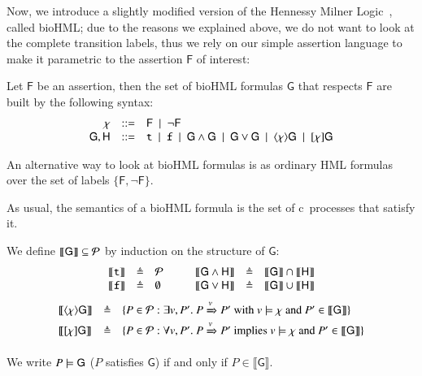 Now, we introduce a slightly modified version of the Hennessy Milner Logic~\cite{HM80}, called bioHML; due to the reasons we explained above, we do not want to look at the complete transition labels, thus we rely on our simple assertion language to make it parametric to the assertion $\mathsf{F}$ of interest:

\begin{definition}[BioHML]
Let   $\mathsf{F}$ be an assertion, then 
the set of bioHML formulas $\mathsf{G}$ that respects $\mathsf{F}$ are built by the following syntax:
$$
\begin{array}{rcl}
\chi & ::= & \mathsf{F}~\mid~ \neg \mathsf{F}\\
\mathsf{G},\mathsf{H} &::= &{\tt t} ~\mid~ {\tt f} ~\mid~ \mathsf{G}\wedge \mathsf{G} ~\mid~ \mathsf{G} \vee \mathsf{G} ~\mid~ \langle \chi \rangle \mathsf{G} ~\mid~ [\chi]\mathsf{G}
\end{array}
$$
\end{definition}

\begin{remark}
An alternative way to look at bioHML formulas is as ordinary HML formulas over the set of labels $\{\mathsf{F},\neg \mathsf{F}\}$.
\end{remark}

As usual, the semantics of a bioHML formula is the set of c\CNA~processes that satisfy it.

\begin{definition}
 We define $\llbracket \mathsf{G}\rrbracket \subseteq {\cal P}$ by induction on the structure of $\mathsf{G}$:
\[
\begin{array}{ccl@{\hspace{1cm}}ccl}
 \llbracket {\tt t}\rrbracket &\defeq& {\cal P} &  \llbracket \mathsf{G}\wedge \mathsf{H}\rrbracket &\defeq&  \llbracket \mathsf{G}\rrbracket  \cap \llbracket \mathsf{H}\rrbracket  \\
\llbracket {\tt f}\rrbracket& \defeq& \emptyset &
  \llbracket \mathsf{G}\vee \mathsf{H}\rrbracket &\defeq&  \llbracket \mathsf{G}\rrbracket  \cup \llbracket \mathsf{H}\rrbracket \\
\end{array}
\]
\[
\begin{array}{lcl}
 \llbracket  \langle \chi \rangle \mathsf{G} \rrbracket &\triangleq& \{P \in {\cal P}: \exists v,P'.\ P\xRightarrow{v}P' \mbox{ with } v \models \chi \mbox{ and } P' \in  \llbracket  \mathsf{G} \rrbracket\} \\
 \llbracket [\chi]\mathsf{G} \rrbracket &\triangleq& \{P \in {\cal P}: \forall v,P'.\ P\xRightarrow{v}P' \mbox{ implies } v \models \chi \mbox{ and } P' \in  \llbracket  \mathsf{G} \rrbracket\}
\end{array}
\]

We write $P \models \mathsf{G}$ ($P$ satisfies $\mathsf{G}$) if and only if $P \in  \llbracket \mathsf{G} \rrbracket$.
\end{definition}

